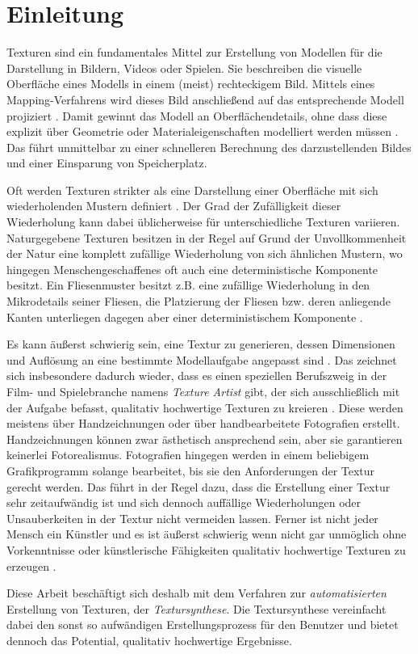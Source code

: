 \section{Einleitung}

Texturen sind ein fundamentales Mittel zur Erstellung von Modellen für die Darstellung in Bildern, Videos oder Spielen.
Sie beschreiben die visuelle Oberfläche eines Modells in einem (meist) rechteckigem Bild.
Mittels eines Mapping-Verfahrens wird dieses Bild anschließend auf das entsprechende Modell projiziert \cite{SelfTuning}.
Damit gewinnt das Modell an Oberflächendetails, ohne dass diese explizit über Geometrie oder Materialeigenschaften modelliert werden müssen \cite{StateOfTheArt}.
Das führt unmittelbar zu einer schnelleren Berechnung des darzustellenden Bildes und einer Einsparung von Speicherplatz.

Oft werden Texturen strikter als eine Darstellung einer Oberfläche mit sich wiederholenden Mustern definiert \cite{StateOfTheArt}.
Der Grad der Zufälligkeit dieser Wiederholung kann dabei üblicherweise für unterschiedliche Texturen variieren.
Naturgegebene Texturen besitzen in der Regel auf Grund der Unvollkommenheit der Natur eine komplett zufällige Wiederholung von sich ähnlichen Mustern, wo hingegen Menschengeschaffenes oft auch eine deterministische Komponente besitzt.
Ein Fliesenmuster besitzt z.B. eine zufällige Wiederholung in den Mikrodetails seiner Fliesen, die Platzierung der Fliesen bzw. deren anliegende Kanten unterliegen dagegen aber einer deterministischem Komponente \cite{StateOfTheArt}.

Es kann äußerst schwierig sein, eine Textur zu generieren, dessen Dimensionen und Auflösung an eine bestimmte Modellaufgabe angepasst sind \cite{SelfTuning}.
Das zeichnet sich insbesondere dadurch wieder, dass es einen speziellen Berufszweig in der Film- und Spielebranche namens \emph{Texture Artist} gibt, der sich ausschließlich mit der Aufgabe befasst, qualitativ hochwertige Texturen zu kreieren \cite{StateOfTheArt}.
Diese werden meistens über Handzeichnungen oder über handbearbeitete Fotografien erstellt.
Handzeichnungen können zwar ästhetisch ansprechend sein, aber sie garantieren keinerlei Fotorealismus.
Fotografien hingegen werden in einem beliebigem Grafikprogramm solange bearbeitet, bis sie den Anforderungen der Textur gerecht werden.
Das führt in der Regel dazu, dass die Erstellung einer Textur sehr zeitaufwändig ist und sich dennoch auffällige Wiederholungen oder Unsauberkeiten in der Textur nicht vermeiden lassen.
Ferner ist nicht jeder Mensch ein Künstler und es ist äußerst schwierig wenn nicht gar unmöglich ohne Vorkenntnisse oder künstlerische Fähigkeiten qualitativ hochwertige Texturen zu erzeugen \cite{StateOfTheArt}.

Diese Arbeit beschäftigt sich deshalb mit dem Verfahren zur \emph{automatisierten} Erstellung von Texturen, der \emph{Textursynthese}.
Die Textursynthese vereinfacht dabei den sonst so aufwändigen Erstellungsprozess für den Benutzer und bietet dennoch das Potential, qualitativ hochwertige Ergebnisse.